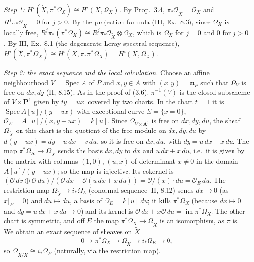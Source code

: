 \documentclass[11pt]{article}
\begin{document}
\emph{Step 1: $H^i(\widetilde X,\pi^*\Omega_X)\cong H^i(X,\Omega_X)$.} By Prop.~3.4, $\pi_*\mathcal O_{\widetilde X}=\mathcal O_X$ and $R^j\pi_*\mathcal O_{\widetilde X}=0$ for $j>0$. By the projection formula (III, Ex.~8.3), since $\Omega_X$ is locally free, $R^j\pi_*(\pi^*\Omega_X)\cong R^j\pi_*\mathcal O_{\widetilde X}\otimes\Omega_X$, which is $\Omega_X$ for $j=0$ and $0$ for $j>0$. By III, Ex.~8.1 (the degenerate Leray spectral sequence), $H^i(\widetilde X,\pi^*\Omega_X)\cong H^i(X,\pi_*\pi^*\Omega_X)=H^i(X,\Omega_X)$.

\emph{Step 2: the exact sequence and the local calculation.} Choose an affine neighbourhood $V=\operatorname{Spec}A$ of $P$ and $x,y\in A$ with $(x,y)=\mathfrak m_P$ such that $\Omega_V$ is free on $dx,dy$ (II, 8.15). As in the proof of (3.6), $\pi^{-1}(V)$ is the closed subscheme of $V\times\mathbf P^1$ given by $ty=ux$, covered by two charts. In the chart $t=1$ it is $\operatorname{Spec}A[u]/(y-ux)$ with exceptional curve $E=\{x=0\}$, $\mathcal O_E=A[u]/(x,y-ux)=k[u]$. Since $\Omega_{V\times\mathbf A^1}$ is free on $dx,dy,du$, the sheaf $\Omega_{\widetilde X}$ on this chart is the quotient of the free module on $dx,dy,du$ by $d(y-ux)=dy-u\,dx-x\,du$, so it is free on $dx,du$, with $dy=u\,dx+x\,du$. The map $\pi^*\Omega_X\to\Omega_{\widetilde X}$ sends the basis $dx,dy$ to $dx$ and $u\,dx+x\,du$, i.e.\ it is given by the matrix with columns $(1,0)$, $(u,x)$ of determinant $x\ne0$ in the domain $A[u]/(y-ux)$; so the map is injective. Its cokernel is $(\mathcal O\,dx\oplus\mathcal O\,du)/(\mathcal O\,dx+\mathcal O(u\,dx+x\,du))=\mathcal O/(x)\cdot du=\mathcal O_E\,du$. The restriction map $\Omega_{\widetilde X}\to i_*\Omega_E$ (conormal sequence, II, 8.12) sends $dx\mapsto 0$ (as $x|_E=0$) and $du\mapsto du$, a basis of $\Omega_E=k[u]\,du$; it kills $\pi^*\Omega_X$ (because $dx\mapsto0$ and $dy=u\,dx+x\,du\mapsto0$) and its kernel is $\mathcal O\,dx+x\mathcal O\,du=\operatorname{im}\pi^*\Omega_X$. The other chart is symmetric, and off $E$ the map $\pi^*\Omega_X\to\Omega_{\widetilde X}$ is an isomorphism, as $\pi$ is. We obtain an exact sequence of sheaves on $\widetilde X$
\[
0\to\pi^*\Omega_X\to\Omega_{\widetilde X}\to i_*\Omega_E\to0,
\]
so $\Omega_{\widetilde X/X}\cong i_*\Omega_E$ (naturally, via the restriction map).
\end{document}

